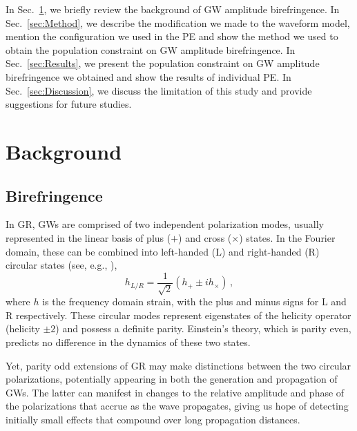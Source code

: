 \documentclass[aps,prd,twocolumn,superscriptaddress,preprintnumbers,floatfix,nofootinbib]{revtex4-2}
\begin{document}
In Sec.~\ref{sec:Background}, we briefly review the background of \ac{GW} amplitude birefringence.
In Sec.~\ref{sec:Method}, we describe the modification we made to the waveform model, mention the configuration we used in the \ac{PE} and show the method we used to obtain the population constraint on \ac{GW} amplitude birefringence.
In Sec.~\ref{sec:Results}, we present the population constraint on \ac{GW} amplitude birefringence we obtained and show the results of individual \ac{PE}.
In Sec.~\ref{sec:Discussion}, we discuss the limitation of this study and provide suggestions for future studies.

\section{Background}
\label{sec:Background}

\subsection{Birefringence}
\label{sec:waveform}

In \ac{GR}, \acp{GW} are comprised of two independent polarization modes, usually represented in the linear basis of plus ($+$) and cross ($\times$) states.
In the Fourier domain, these can be combined into left-handed (L) and right-handed (R) circular states (see, e.g., \cite{Isi:2022mbx}),
\begin{equation}
    h_{L/R} = \frac{1}{\sqrt{2}}\left(h_+ \pm i h_\times\right)\,,
\end{equation}
where $h$ is the frequency domain strain, with the plus and minus signs for L and R respectively.
These circular modes represent eigenstates of the helicity operator (helicity $\pm2$) and possess a definite parity.
Einstein's theory, which is parity even, predicts no difference in the dynamics of these two states.

Yet, parity odd extensions of \ac{GR} may make distinctions between the two circular polarizations, potentially appearing in both the generation and propagation of \acp{GW}.
The latter can manifest in changes to the relative amplitude and phase of the polarizations that accrue as the wave propagates, giving us hope of detecting initially small effects that compound over long propagation distances.
\end{document}
